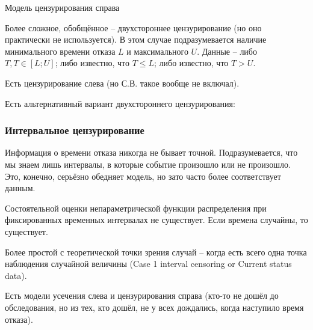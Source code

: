 \documentclass[main.tex]{sufbfiles}
\begin{document}
Модель цензурирования справа

Более сложное, обобщённое -- двухстороннее цензурирование (но оно практически не используется).
В этом случае подразумевается наличие минимального времени отказа $ L $ и максимального $ U $.
Данные -- либо $ T, T \in [L; U] $; либо известно, что $ T \le L $; либо известно, что $ T > U $.

Есть цензурирование слева (но С.В. такое вообще не включал).

Есть альтернативный вариант двухстороннего цензурирования: %

\subsubsection{ Интервальное цензурирование }

Информация о времени отказа никогда не бывает точной.
Подразумевается, что мы знаем лишь интервалы, в которые событие произошло или не произошло.
Это, конечно, серьёзно обедняет модель, но зато часто более соответствует данным.

Состоятельной оценки непараметрической функции распределения при фиксированных временных интервалах не существует.
Если времена случайны, то существует.

Более простой с теоретической точки зрения случай -- когда есть всего одна точка наблюдения случайной величины (Case 1 interval censoring or Current status data).

Есть модели усечения слева и цензурирования справа (кто-то не дошёл до обследования, но из тех, кто дошёл, не у всех дождались, когда наступило время отказа).
\end{document}
